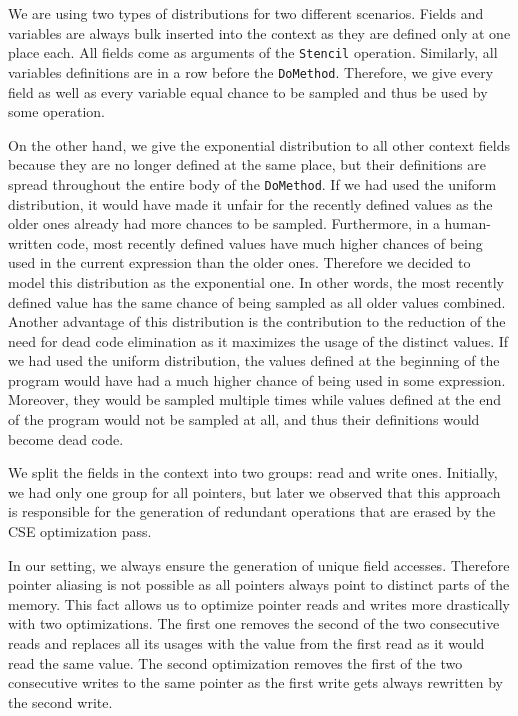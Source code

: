 \documentclass[sigplan,\review anonymous]{acmart}
\begin{document}
We are using two types of distributions for two different scenarios. Fields
and variables are always bulk inserted into the context as they are defined
only at one place each. All fields come as arguments of the \texttt{Stencil}
operation. Similarly, all variables definitions are in a row before the
\texttt{DoMethod}. Therefore, we give every field as well as every variable
equal chance to be sampled and thus be used by some operation. 

On the other hand, we give the exponential distribution to all other context
fields because they are no longer defined at the same place, but their
definitions are spread throughout the entire body of the \texttt{DoMethod}.
If we had used the uniform distribution, it would have made it unfair for the
recently defined values as the older ones already had more chances to be
sampled. Furthermore, in a human-written code, most recently defined values
have much higher chances of being used in the current expression than the older
ones. Therefore we decided to model this distribution as the exponential one.
In other words, the most recently defined value has the same chance of being
sampled as all older values combined. Another advantage of this distribution
is the contribution to the reduction of the need for dead code elimination as
it maximizes the usage of the distinct values. If we had used the uniform
distribution, the values defined at the beginning of the program would have
had a much higher chance of being used in some expression. Moreover, they would
be sampled multiple times while values defined at the end of the program would
not be sampled at all, and thus their definitions would become dead code.

We split the fields in the context into two groups: read and write ones.
Initially, we had only one group for all pointers, but later we observed
that this approach is responsible for the generation of redundant operations
that are erased by the CSE optimization pass.

In our setting, we always ensure the generation of unique field accesses.
Therefore pointer aliasing is not possible as all pointers always point to
distinct parts of the memory. This fact allows us to optimize pointer reads
and writes more drastically with two optimizations. The first one removes the
second of the two consecutive reads and replaces all its usages with the value
from the first read as it would read the same value. The second optimization
removes the first of the two consecutive writes to the same pointer as the
first write gets always rewritten by the second write.
\end{document}
